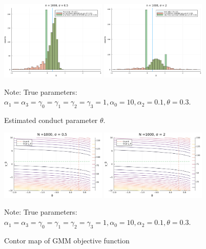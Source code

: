 \documentclass[11pt, a4paper]{article}
\begin{document}
\begin{figure}[!htbp]
  \begin{center}
  \includegraphics[width = 0.45\textwidth]
  {figuretable/histogram_loglinear_loglinear_n_1000_sigma_0.5.pdf}
  \includegraphics[width = 0.45\textwidth]
  {figuretable/histogram_loglinear_loglinear_n_1000_sigma_2.pdf}
  \caption{Estimated conduct parameter $\theta$.}
  \label{fg:histogram_loglinear_loglinear_n_1000_sigma_2} 
  \end{center}
  \footnotesize
  Note: True parameters: $\alpha_1 = \alpha_3 = \gamma_0 = \gamma_1 = \gamma_2  = \gamma_3 = 1, \alpha_0 = 10, \alpha_2 = 0.1,  \theta = 0.3.$
\end{figure} 

\begin{figure}[!htbp]
  \begin{center}
  \includegraphics[width = 0.45\textwidth]
  {figuretable/contour_loglinear_loglinear_n_1000_sigma_0.5.pdf}
  \includegraphics[width = 0.45\textwidth]
  {figuretable/contour_loglinear_loglinear_n_1000_sigma_2.pdf}
  \caption{Contor map of GMM objective function}
  \label{fg:contour_loglinear_loglinear_n_1000_sigma_2} 
  \end{center}
  \footnotesize
  Note: True parameters: $\alpha_1 = \alpha_3 = \gamma_0 = \gamma_1 = \gamma_2  = \gamma_3 = 1, \alpha_0 = 10, \alpha_2 = 0.1,  \theta = 0.3.$
\end{figure} 

\newpage


\end{document}
